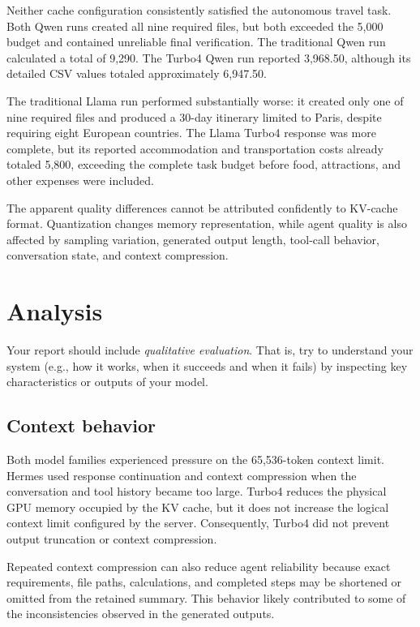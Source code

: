 \documentclass{article}
\begin{document}
Neither cache configuration consistently satisfied the autonomous travel
task. Both Qwen runs created all nine required files, but both exceeded the
\texteuro{}5,000 budget and contained unreliable final verification. The
traditional Qwen run calculated a total of \texteuro{}9,290. The Turbo4
Qwen run reported \texteuro{}3,968.50, although its detailed CSV values
totaled approximately \texteuro{}6,947.50.

The traditional Llama run performed substantially worse: it created only
one of nine required files and produced a 30-day itinerary limited to Paris,
despite requiring eight European countries. The Llama Turbo4 response was
more complete, but its reported accommodation and transportation costs
already totaled \texteuro{}5,800, exceeding the complete task budget before
food, attractions, and other expenses were included.

The apparent quality differences cannot be attributed confidently to
KV-cache format. Quantization changes memory representation, while agent
quality is also affected by sampling variation, generated output length,
tool-call behavior, conversation state, and context compression.

\section{Analysis}
Your report should include \textit{qualitative evaluation}. That is, try to understand your system (e.g., how it works, when it succeeds and when it fails) by inspecting key characteristics or outputs of your model.

\subsection{Context behavior}

Both model families experienced pressure on the 65,536-token context limit.
Hermes used response continuation and context compression when the
conversation and tool history became too large. Turbo4 reduces the physical
GPU memory occupied by the KV cache, but it does not increase the logical
context limit configured by the server. Consequently, Turbo4 did not prevent
output truncation or context compression.

Repeated context compression can also reduce agent reliability because exact
requirements, file paths, calculations, and completed steps may be shortened
or omitted from the retained summary. This behavior likely contributed to
some of the inconsistencies observed in the generated outputs.
\end{document}
